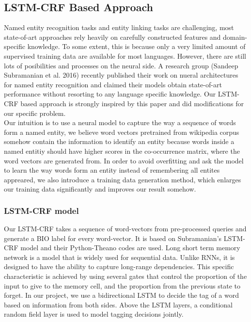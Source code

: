 \documentclass{article}
\begin{document}
\subsection{LSTM-CRF Based Approach}
Named entity recognition tasks and entity linking tasks are challenging, most state-of-art approaches rely heavily on carefully constructed features and domain-specific knowledge. To some extent, this is because only a very limited amount of supervised training data are available for most languages. However, there are still lots of posibilities and processes on the neural side. A research group (Sandeep Subramanian et al. 2016) recently published their work on nueral architectures for named entity recognition and claimed their models obtain state-of-art performance without resorting to any language specific knowledge. Our LSTM-CRF based approach is strongly inspired by this paper and did modifications for our specific problem.\\
Our intuition is to use a neural model to capture the way a sequence of words form a named entity, we believe word vectors pretrained from wikipedia corpus somehow contain the information to identify an entity because words inside a named entitiy should have higher scores in the co-occurrence matrix, where the word vectors are generated from. In order to avoid overfitting and ask the model to learn the way words form an entity instead of remembering all entites appreared, we also introduce a training data generation method, which enlarges our training data significantly and improves our result somehow. 
\subsubsection{LSTM-CRF model}
Our LSTM-CRF takes a sequence of word-vectors from pre-processed queries and generate a BIO label for every word-vector. It is based on Subramanian's LSTM-CRF model and their Python-Theano codes are used. Long short term memory network is a model that is widely used for sequential data. Unlike RNNs, it is designed to have the ability to capture long-range dependencies. This specific characteristic is achieved by using several gates that control the proportion of the input to give to the memory cell, and the proportion from the previous state to forget. In our project, we use a bidirectional LSTM to decide the tag of a word based on information from both sides. Above the LSTM layers, a conditional random field layer is used to model tagging decisions jointly.
\end{document}
